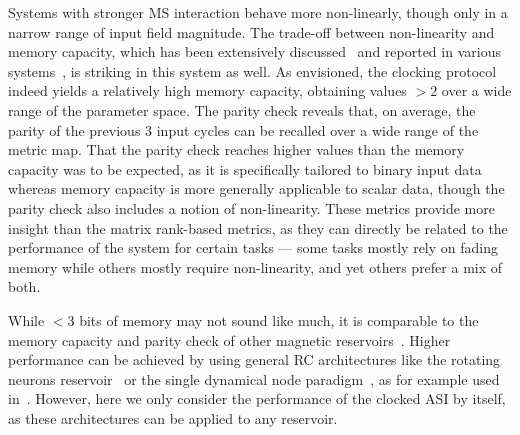 Systems with stronger MS interaction behave more non-linearly, though only in a narrow range of input field magnitude.
The trade-off between non-linearity and memory capacity, which has been extensively discussed~\cite{dambre2012information,MemoryNonlinearityReservoirs,RC_BeyondMemoryNonlinearity,RC_unification} and reported in various systems~\cite{DynamicEmergence_NanomagneticSystem,RC_TaskAgnosticMetrics_v2,TaskAdaptivePRC}, is striking in this system as well.
As envisioned, the clocking protocol indeed yields a relatively high memory capacity, obtaining values $>2$ over a wide range of the parameter space.
The parity check reveals that, on average, the parity of the previous 3 input cycles can be recalled over a wide range of the metric map.
That the parity check reaches higher values than the memory capacity was to be expected, as it is specifically tailored to binary input data whereas memory capacity is more generally applicable to scalar data, though the parity check also includes a notion of non-linearity.
These metrics provide more insight than the matrix rank-based metrics, as they can directly be related to the performance of the system for certain tasks --- some tasks mostly rely on fading memory while others mostly require non-linearity, and yet others prefer a mix of both. \par
While $<3$ bits of memory may not sound like much, it is comparable to the memory capacity and parity check of other magnetic reservoirs~\cite{AdaptiveProgrammableRC,hon2021numerical,tsunegi2019STOforcedsyncRC,Venkat_2024}. %
Higher performance can be achieved by using general RC architectures like the rotating neurons reservoir~\cite{RotatingNeuronsRC} or the single dynamical node paradigm~\cite{appeltant2011information}, as for example used in~.
However, here we only consider the performance of the clocked ASI by itself, as these architectures can be applied to any reservoir.

